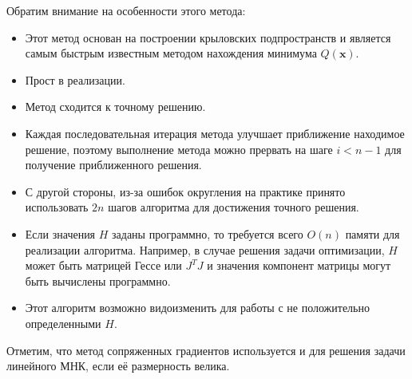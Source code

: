\documentclass[fontsize=12pt, paper=a4]{article}
\renewcommand{\vec}[1]{\mathbf{#1}}
\def\x{\vec{x}}
\begin{document}
Обратим внимание на особенности этого метода:
\begin{itemize}
 \item Этот метод основан на построении крыловских подпространств и является самым быстрым известным методом нахождения минимума $Q(\x)$.
 \item Прост в реализации.
 \item Метод сходится к точному решению.
 \item Каждая последовательная итерация метода улучшает приближение находимое решение, поэтому выполнение метода можно прервать на шаге $i < n-1$ для получение приближенного решения.
 \item С другой стороны, из-за ошибок округления на практике принято использовать $2n$ шагов алгоритма для достижения точного решения.
 \item Если значения $H$ заданы программно, то требуется всего $O(n)$ памяти для реализации алгоритма. Например, в случае решения задачи оптимизации, $H$ может быть матрицей Гессе или $J^TJ$ и значения компонент матрицы могут быть вычислены программно.
 \item Этот алгоритм возможно видоизменить для работы с не положительно определенными $H$.
\end{itemize}

Отметим, что метод сопряженных градиентов используется и для решения задачи линейного МНК, если её размерность велика.
\end{document}
